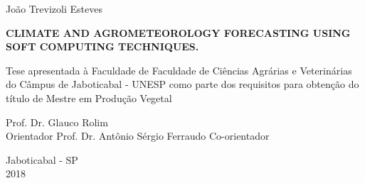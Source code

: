 \clearpage

\thispagestyle{empty}

\centerline{{\normalsize{João Trevizoli Esteves}}}

\vspace*{4.5cm}


\begin{center}
\Large\textrm{\textbf{
CLIMATE AND AGROMETEOROLOGY FORECASTING USING SOFT COMPUTING TECHNIQUES.}} %
\end{center}
\vspace*{5cm}

\hspace*{7.3cm} 
\begin{minipage}[b]{0.45\linewidth}
  \begin{espacosimples}
    Tese apresentada à Faculdade de Faculdade de Ciências Agrárias e Veterinárias do Câmpus de Jaboticabal - UNESP como parte dos requisitos para obtenção do título de Mestre em Produção Vegetal 
  \end{espacosimples}
\end{minipage}


\vspace*{0.5cm}

\begin{flushleft}
\begin{espacosimples}
\normalsize
\hspace*{8.0cm} Prof. Dr. Glauco Rolim \\[0.5ex]
\hspace*{8.0cm} Orientador
\hspace*{8.0cm} Prof. Dr. Antônio Sérgio Ferraudo
\hspace*{8.0cm} Co-orientador
\end{espacosimples}
\end{flushleft}


\vspace*{2.0cm}
\begin{center}
Jaboticabal - SP\\ 2018
\end{center}

